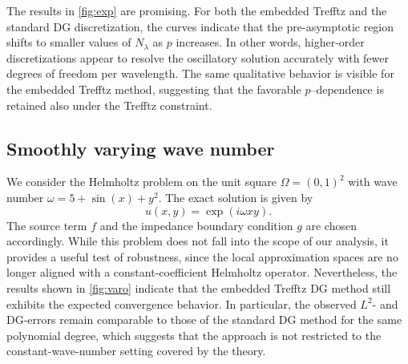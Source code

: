 \documentclass[11pt]{article}
\theoremstyle{definition}
\theoremstyle{plain}
\begin{document}
The results in \cref{fig:exp} are promising.
For both the embedded Trefftz and the standard DG discretization, the curves indicate that the pre-asymptotic region shifts to smaller values of $N_\lambda$ as $p$ increases.
In other words, higher-order discretizations appear to resolve the oscillatory solution accurately with fewer degrees of freedom per wavelength.
The same qualitative behavior is visible for the embedded Trefftz method, suggesting that the favorable $p$--dependence is retained also under the Trefftz constraint.



\subsection{Smoothly varying wave number}\label{sec:varo}

We consider the Helmholtz problem on the unit square $\Omega=(0,1)^2$ with wave number $\omega=5+\sin(x)+y^2$.
The exact solution is given by 
\begin{equation}\label{eq:varo}
    u(x,y)=\exp(i\omega x y).  
\end{equation}
The source term $f$ and the impedance boundary condition $g$ are chosen accordingly.
While this problem does not fall into the scope of our analysis, it provides a useful test of robustness, since the local approximation spaces are no longer aligned with a constant-coefficient Helmholtz operator.
Nevertheless, the results shown in \cref{fig:varo} indicate that the embedded Trefftz DG method still exhibits the expected convergence behavior.
In particular, the observed $L^2$- and DG-errors remain comparable to those of the standard DG method for the same polynomial degree, which suggests that the approach is not restricted to the constant-wave-number setting covered by the theory.
\end{document}
